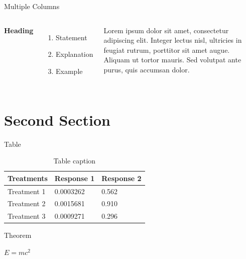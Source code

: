 \documentclass[aspectratio=169,xcolor=dvipsnames]{beamer}
\begin{document}
\begin{frame}{Multiple Columns}
    \begin{columns}[c] %

        \textbf{Heading}
        \begin{enumerate}
            \item Statement
            \item Explanation
            \item Example
        \end{enumerate}

        Lorem ipsum dolor sit amet, consectetur adipiscing elit. Integer lectus nisl, ultricies in feugiat rutrum, porttitor sit amet augue. Aliquam ut tortor mauris. Sed volutpat ante purus, quis accumsan dolor.

    \end{columns}
\end{frame}

\section{Second Section}

\begin{frame}{Table}
    \begin{table}
        \begin{tabular}{l l l}
            \toprule
            \textbf{Treatments} & \textbf{Response 1} & \textbf{Response 2} \\
            \midrule
            Treatment 1         & 0.0003262           & 0.562               \\
            Treatment 2         & 0.0015681           & 0.910               \\
            Treatment 3         & 0.0009271           & 0.296               \\
            \bottomrule
        \end{tabular}
        \caption{Table caption}
    \end{table}
\end{frame}


\begin{frame}{Theorem}
    \begin{theorem}
        $E = mc^2$
    \end{theorem}
\end{frame}
\end{document}

